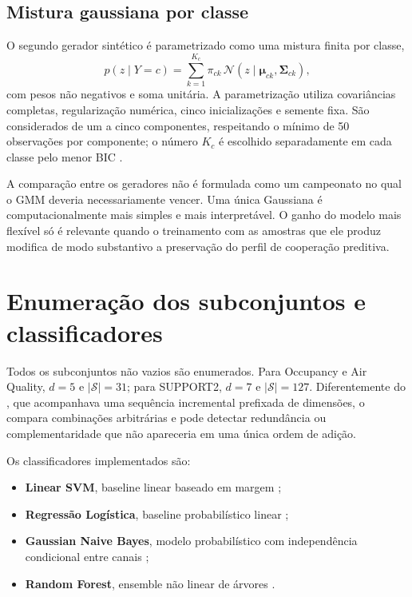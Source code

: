 \subsection{Mistura gaussiana por classe}

O segundo gerador sintético é parametrizado como uma mistura finita por classe,
\begin{equation}
  p(z\mid Y=c)=\sum_{k=1}^{K_c}\pi_{ck}\,
  \mathcal{N}(z\mid\bm\mu_{ck},\bm\Sigma_{ck}),
  \label{eq:method-gmm}
\end{equation}
com pesos não negativos e soma unitária. A parametrização utiliza covariâncias completas, regularização numérica, cinco inicializações e semente fixa. São considerados de um a cinco componentes, respeitando o mínimo de 50 observações por componente; o número $K_c$ é escolhido separadamente em cada classe pelo menor BIC \cite{mclachlan2000,schwarz1978}.

A comparação entre os geradores não é formulada como um campeonato no qual o GMM deveria necessariamente vencer. Uma única Gaussiana é computacionalmente mais simples e mais interpretável. O ganho do modelo mais flexível só é relevante quando o treinamento com as amostras que ele produz modifica de modo substantivo a preservação do perfil de cooperação preditiva.

\section{Enumeração dos subconjuntos e classificadores}

Todos os subconjuntos não vazios são enumerados. Para Occupancy e Air Quality, $d=5$ e $|\mathcal{S}|=31$; para SUPPORT2, $d=7$ e $|\mathcal{S}|=127$. Diferentemente do \SLACGS, que acompanhava uma sequência incremental prefixada de dimensões, o \CoInfoSim{} compara combinações arbitrárias e pode detectar redundância ou complementaridade que não apareceria em uma única ordem de adição.

Os classificadores implementados são:

\begin{itemize}
  \item \textbf{Linear SVM}, baseline linear baseado em margem \cite{cortes1995};
  \item \textbf{Regressão Logística}, baseline probabilístico linear \cite{hosmer2013};
  \item \textbf{Gaussian Naive Bayes}, modelo probabilístico com independência condicional entre canais \cite{handyu2001};
  \item \textbf{Random Forest}, ensemble não linear de árvores \cite{breiman2001}.
\end{itemize}

